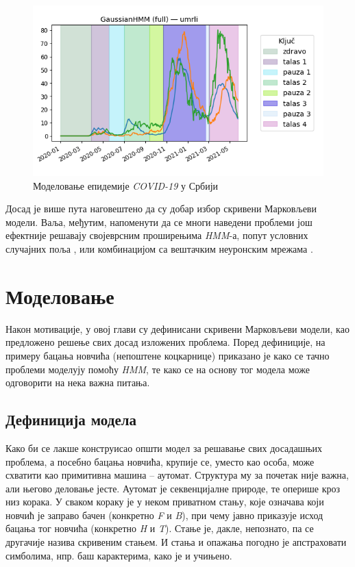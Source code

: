 \documentclass[12pt,oneside]{memoir}
\begin{document}
\begin{CJK}{UTF8}{ipxm}
\begin{figure}[H]
  \centering
  \includegraphics[width=.8\textwidth]{covid.png}
  \caption{Моделовање епидемије \textit{COVID-19} у Србији \cite{vasovic2021}}
  \label{fig:covid}
\end{figure}

Досад је више пута наговештено да су добар избор скривени Марковљеви модели. Ваља, међутим, напоменути да се многи наведени проблеми још ефектније решавају својеврсним проширењима \textit{HMM}-а, попут условних случајних поља \cite{ponomareva2007}, или комбинацијом са вештачким неуронским мрежама \cite{cohen1999}.

\chapter{Моделовање}
Након мотивације, у овој глави су дефинисани скривени Марковљеви модели, као предложено решење свих досад изложених проблема. Поред дефиниције, на примеру бацања новчића (непоштене коцкарнице) приказано је како се тачно проблеми моделују помоћу \textit{HMM}, те како се на основу тог модела може одговорити на нека важна питања.

\section{Дефиниција модела}
Како би се лакше конструисао општи модел за решавање свих досадашњих проблема, а посебно бацања новчића, крупије се, уместо као особа, може схватити као примитивна машина -- аутомат. Структура му за почетак није важна, али његово деловање јесте. Аутомат је секвенцијалне природе, те оперише кроз низ корака. У сваком кораку је у неком приватном стању, које означава који новчић је заправо бачен (конкретно \textit{F} и \textit{B}), при чему јавно приказује исход бацања тог новчића (конкретно \textit{H} и \textit{T}). Стање је, дакле, непознато, па се другачије назива скривеним стањем. И стања и опажања погодно је апстраховати симболима, нпр. баш карактерима, како је и учињено.


\end{CJK}
\end{document}
